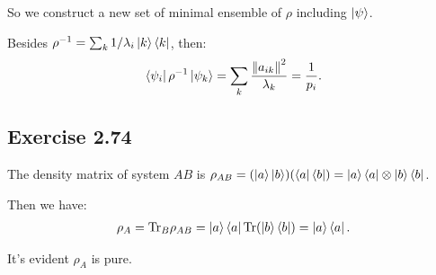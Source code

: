 So we construct a new set of minimal ensemble of $\rho$ including $\ket{\psi}$.

Besides $\rho^{-1}=\sum_k 1/\lambda_i \ket{k}\bra{k}$, then:
\begin{align}
\bra{\psi_i}\rho^{-1}\ket{\psi_k}=\sum_k \frac{\norm{a_{ik}}^2}{\lambda_k}=\frac{1}{p_i}.
\end{align}

\subsection*{Exercise 2.74}

The density matrix of system $A B$ is $\rho_{AB}=(\ket{a}\ket{b})(\bra{a}\bra{b})=\ket{a}\bra{a}\otimes\ket{b}\bra{b}$.

Then we have:
\begin{align}
\rho_A={\rm Tr}_B \rho_{AB} = \ket{a}\bra{a}\text {Tr}(\ket{b}\bra{b})=\ket{a}\bra{a}.
\end{align}

It's evident $\rho_A$ is pure.

